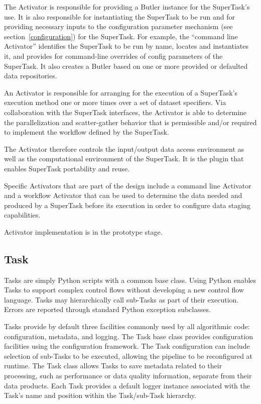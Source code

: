\documentclass[DM,lsstdraft,toc]{lsstdoc}
\begin{document}
The Activator is responsible for providing a Butler instance for the
SuperTask’s use. It is also responsible for instantiating the SuperTask to be
run and for providing necessary inputs to the configuration parameter mechanism
(see section~\ref{configuration}) for the SuperTask. For example, the “command
line Activator” identifies the SuperTask to be run by name, locates and
instantiates it, and provides for command-line overrides of config parameters
of the SuperTask. It also creates a Butler based on one or more provided or
defaulted data repositories.

An Activator is responsible for arranging for the execution of a SuperTask’s
execution method one or more times over a set of dataset specifiers. Via
collaboration with the SuperTask interfaces, the Activator is able to determine
the parallelization and scatter-gather behavior that is permissible and/or
required to implement the workflow defined by the SuperTask.

The Activator therefore controls the input/output data access environment as
well as the computational environment of the SuperTask.  It is the plugin that
enables SuperTask portability and reuse.

Specific Activators that are part of the design include a command line
Activator and a workflow Activator that can be used to determine the data
needed and produced by a SuperTask before its execution in order to configure
data staging capabilities.

Activator implementation is in the prototype stage.

\subsection{Task}\label{task}

Tasks are simply Python scripts with a common base class. Using Python enables
Tasks to support complex control flows without developing a new control flow
language. Tasks may hierarchically call sub-Tasks as part of their execution.
Errors are reported through standard Python exception subclasses.

Tasks provide by default three facilities commonly used by all algorithmic
code: configuration, metadata, and logging.  The Task base class provides
configuration facilities using the configuration framework. The Task
configuration can include selection of sub-Tasks to be executed, allowing the
pipeline to be reconfigured at runtime.  The Task class allows Tasks to save
metadata related to their processing, such as performance or data quality
information, separate from their data products.  Each Task provides a default
logger instance associated with the Task's name and position within the
Task/sub-Task hierarchy.
\end{document}
